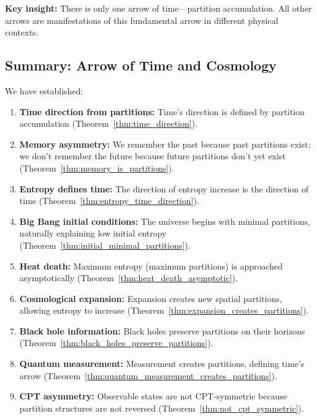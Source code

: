 \documentclass[twocolumn,10pt]{article}
\theoremstyle{definition}
\theoremstyle{remark}
\begin{document}
\noindent\textbf{Key insight:} There is only one arrow of time—partition accumulation. All other arrows are manifestations of this fundamental arrow in different physical contexts.

\subsection{Summary: Arrow of Time and Cosmology}

We have established:

\begin{enumerate}
\item \textbf{Time direction from partitions:} Time's direction is defined by partition accumulation (Theorem~\ref{thm:time_direction}).

\item \textbf{Memory asymmetry:} We remember the past because past partitions exist; we don't remember the future because future partitions don't yet exist (Theorem~\ref{thm:memory_is_partitions}).

\item \textbf{Entropy defines time:} The direction of entropy increase is the direction of time (Theorem~\ref{thm:entropy_time_direction}).

\item \textbf{Big Bang initial conditions:} The universe begins with minimal partitions, naturally explaining low initial entropy (Theorem~\ref{thm:initial_minimal_partitions}).

\item \textbf{Heat death:} Maximum entropy (maximum partitions) is approached asymptotically (Theorem~\ref{thm:heat_death_asymptotic}).

\item \textbf{Cosmological expansion:} Expansion creates new spatial partitions, allowing entropy to increase (Theorem~\ref{thm:expansion_creates_partitions}).

\item \textbf{Black hole information:} Black holes preserve partitions on their horizons (Theorem~\ref{thm:black_holes_preserve_partitions}).

\item \textbf{Quantum measurement:} Measurement creates partitions, defining time's arrow (Theorem~\ref{thm:quantum_measurement_creates_partitions}).

\item \textbf{CPT asymmetry:} Observable states are not CPT-symmetric because partition structures are not reversed (Theorem~\ref{thm:not_cpt_symmetric}).


\end{enumerate}
\end{document}
